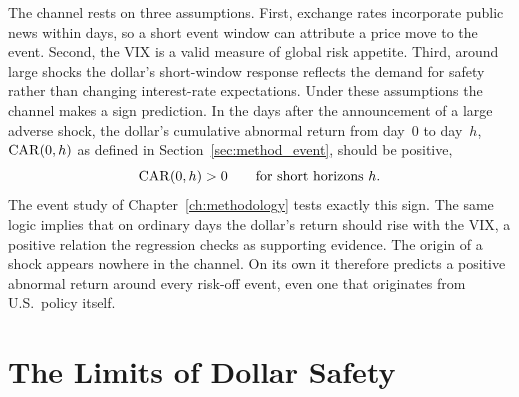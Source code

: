 The channel rests on three assumptions. First, exchange rates incorporate public news within days, so a short event window can attribute a price move to the event. Second, the VIX is a valid measure of global risk appetite. Third, around large shocks the dollar's short-window response reflects the demand for safety rather than changing interest-rate expectations. Under these assumptions the channel makes a sign prediction. In the days after the announcement of a large adverse shock, the dollar's cumulative abnormal return from day~0 to day~$h$, $\mathrm{CAR}(0,h)$ as defined in Section~\ref{sec:method_event}, should be positive,
\begin{equation*}
  \mathrm{CAR}(0,h) > 0 \qquad \text{for short horizons } h.
\end{equation*}
The event study of Chapter~\ref{ch:methodology} tests exactly this sign. The same logic implies that on ordinary days the dollar's return should rise with the VIX, a positive relation the regression checks as supporting evidence. The origin of a shock appears nowhere in the channel. On its own it therefore predicts a positive abnormal return around every risk-off event, even one that originates from U.S.\ policy itself.

\section{The Limits of Dollar Safety}
\label{sec:fw_repricing}



